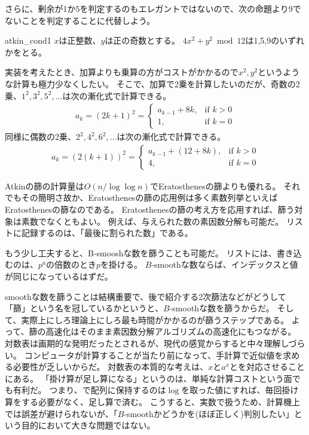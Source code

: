 さらに、剰余が1か5を判定するのもエレガントではないので、次の命題より9でないことを判定することに代替しよう。

\begin{Prop}{}{atkin_cond1}
$x$は正整数、$y$は正の奇数とする。
$4x^2+y^2 \bmod{12}$は1,5,9のいずれかをとる。
\end{Prop}

実装を考えたとき、加算よりも乗算の方がコストがかかるので$x^2,y^2$というような計算も極力少なくしたい。
そこで、加算で2乗を計算したいのだが、奇数の2乗、$1^2,3^2,5^2,\ldots$は次の漸化式で計算できる。
\begin{align*}
a_{k} = (2k+1)^2 =
\begin{cases}
a_{k-1} + 8k, &\mbox{if } k > 0\\
1, &\mbox{if } k = 0
\end{cases}
\end{align*}
同様に偶数の2乗、$2^2,4^2,6^2,\ldots$は次の漸化式で計算できる。
\begin{align*}
a_k = (2(k+1))^2 =
\begin{cases}
a_{k-1} + (12 + 8k), &\mbox{if } k > 0\\
4, &\mbox{if } k = 0
\end{cases}
\end{align*}


Atkinの篩の計算量は$O(n/\log{\log{n}})$でEratosthenesの篩よりも優れる。
それでもその簡明さ故か、Eratosthenesの篩の応用例は多く素数列挙といえばEratosthenesの篩なのである。
Eratosthenesの篩の考え方を応用すれば、篩う対象は素数でなくともよい。
例えば、与えられた数の素因数分解も可能だ。
リストに記録するのは、「最後に割られた数」である。


もう少し工夫すると、B-smooshな数を篩うことも可能だ。
リストには、書き込むのは、$p^a$の倍数のとき$p$を掛ける。
$B$-smoothな数ならば、インデックスと値が同じになっているはずだ。


smoothな数を篩うことは結構重要で、後で紹介する2次篩法などがどうして「篩」という名を冠しているかというと、$B$-smoothな数を篩うからだ。
そして、実際上にしろ理論上にしろ最も時間がかかるのが篩うステップである。
よって、篩の高速化はそのまま素因数分解アルゴリズムの高速化にもつながる。
対数表は画期的な発明だったとされるが、現代の感覚からすると中々理解しづらい。
コンピュータが計算することが当たり前になって、手計算で近似値を求める必要性が乏しいからだ。
対数表の本質的な考えは、$x$と$a^x$とを対応させることにある。
「掛け算が足し算になる」というのは、単純な計算コストという面でも有利だ。
つまり、で配列に保持するのは$\log$を取った値にすれば、毎回掛け算をする必要がなく、足し算で済む。
こうすると、実数で扱うため、計算機上では誤差が避けられないが、「$B$-smoothかどうかを(ほぼ正しく)判別したい」という目的において大きな問題ではない。


